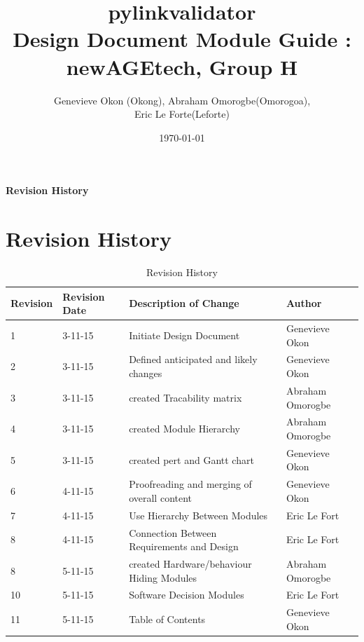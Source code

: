 \documentclass[titlepage]{article}
\begin{document}
\title{pylinkvalidator \\
 Design Document Module Guide : newAGEtech, Group H }
\author{Genevieve Okon (Okong), Abraham Omorogbe(Omorogoa),\\
 Eric Le Forte(Leforte)}
\date{\today}
\maketitle


\tableofcontents
\listoffigures
\listoftables

\textbf{Revision History} \\ \normalsize
\pagebreak

\section{Revision History}
\begin{table}[h!]
	\begin{tabular}{| p{5cm} | p{5cm} | p{5cm} |p{5cm} |}    \hline
Revision  &Revision Date &Description of Change &Author\\ \hline
1& 3-11-15& Initiate Design Document&Genevieve Okon\\ \hline
2& 3-11-15& Defined anticipated and likely changes&Genevieve Okon\\ \hline
3& 3-11-15& created Tracability matrix &Abraham Omorogbe\\ \hline
4& 3-11-15& created  Module Hierarchy&Abraham Omorogbe\\ \hline
5& 3-11-15&created pert and Gantt chart&Genevieve Okon\\ \hline
6& 4-11-15& Proofreading and merging of overall content&Genevieve Okon\\ \hline
7& 4-11-15& Use Hierarchy Between Modules&Eric Le Fort\\ \hline
8& 4-11-15&Connection Between Requirements and Design&Eric Le Fort\\ \hline
8& 5-11-15& created Hardware/behaviour Hiding Modules&Abraham Omorogbe\\ \hline
10& 5-11-15& Software Decision Modules&Eric Le Fort\\ \hline
11& 5-11-15& Table of Contents&Genevieve Okon\\ \hline
       \end{tabular}
       
       \caption{Revision History}
       \label{table:Revision History}
\end{table}
\end{document}
